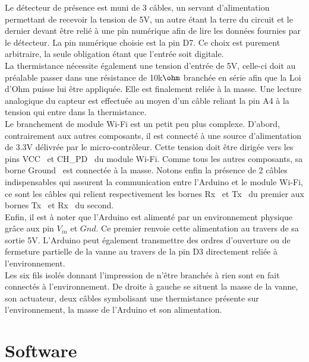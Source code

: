 \documentclass[11pt,a4paper,11pt]{report}
\begin{document}
	Le détecteur de présence est muni de 3 câbles, un servant d’alimentation permettant de recevoir la tension de 5V, un autre étant la terre du circuit et le dernier devant être relié à une pin numérique afin de lire les données fournies par le détecteur. La pin numérique choisie est la pin D7. Ce choix est purement arbitraire, la seule obligation étant que l'entrée soit digitale.\\

	La thermistance nécessite également une tension d’entrée de 5V, celle-ci doit au préalable passer dans une résistance de 10k$\ohm$ branchée en série afin que la Loi d'Ohm puisse lui être appliquée. Elle est finalement reliée à la masse. Une lecture analogique du capteur est effectuée au moyen d'un câble reliant la pin A4 à la tension qui entre dans la thermistance.\\

Le branchement de module Wi-Fi est un petit peu plus complexe. D’abord, contrairement aux autres composants, il est connecté à une source d’alimentation de 3.3V délivrée par le micro-contrôleur. Cette tension doit être dirigée vers les pins \og VCC \fg ~et \og CH\_PD \fg ~du module Wi-Fi. Comme tous les autres composants, sa borne \og Ground \fg ~est connectée à la masse. Notons enfin la présence de 2 câbles indispensables qui assurent la communication entre l'Arduino et le module Wi-Fi, ce sont les câbles qui relient respectivement les bornes \og Rx \fg ~et \og Tx \fg ~du premier aux bornes \og Tx \fg ~et \og Rx \fg ~du second.\\

Enfin, il est à noter que l'Arduino est alimenté par un environnement physique grâce aux pin $V_{in}$ et $Gnd$. Ce premier \og renvoie \fg cette alimentation au travers de sa sortie 5V. L'Arduino peut également transmettre des ordres d'ouverture ou de fermeture partielle de la vanne au travers de la pin D3 directement reliée à l'environnement.\\

Les six fils isolés donnant l'impression de n'être branchés à rien sont en fait connectés à l'environnement. De droite à gauche se situent la masse de la vanne, son actuateur, deux câbles symbolisant une thermistance présente sur l'environnement, la masse de l'Arduino et son alimentation.\\

\section{Software}
\end{document}
